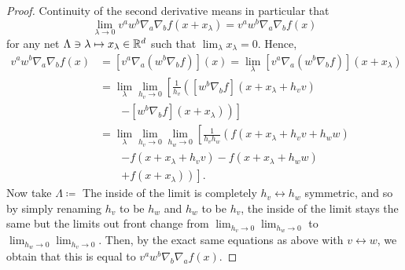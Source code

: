 \begin{thm}
\begin{proof}
Continuity of the second derivative means in particular that
\begin{equation}
\lim _{\lambda \to 0}v^aw^b\nabla _a\nabla _bf(x+x_\lambda )=v^aw^b\nabla _a\nabla _bf(x)
\end{equation}
for any net $\Lambda \ni \lambda \mapsto x_\lambda \in \mathbb{R} ^d$ such that $\lim _\lambda x_\lambda =0$.  Hence,
\begin{equation}
\begin{split}
v^aw^b\nabla _a\nabla _bf(x) & =[v^a\nabla _a(w^b\nabla _bf)](x)=\lim _\lambda [v^a\nabla _a(w^b\nabla _bf)](x+x_\lambda ) \\
& =\lim _\lambda \lim _{h_v\to 0}\left[ \frac{1}{h_v}\left( [w^b\nabla _bf](x+x_\lambda +h_vv)\right. \right. \\
& \qquad \left. \left. -[w^b\nabla _bf](x+x_\lambda )\right) \right] \\
& =\lim _\lambda \lim _{h_v\to 0}\lim _{h_w\to 0}\left[ \frac{1}{h_vh_w}\left( f(x+x_\lambda +h_vv+h_ww)\right. \right. \\
& \qquad \left. \left. -f(x+x_\lambda +h_vv)-f(x+x_\lambda +h_ww)\right. \right. \\
& \qquad \left. \left. +f(x+x_\lambda )\right) \right] .
\end{split}
\end{equation}
Now take $\Lambda \coloneqq $
The inside of the limit is completely $h_v\leftrightarrow h_w$ symmetric, and so by simply renaming $h_v$ to be $h_w$ and $h_w$ to be $h_v$, the inside of the limit stays the same but the limits out front change from $\lim _{h_v\to 0}\lim _{h_w\to 0}$ to $\lim _{h_w\to 0}\lim _{h_v\to 0}$.  Then, by the exact same equations as above with $v\leftrightarrow w$, we obtain that this is equal to $v^aw^b\nabla _b\nabla _af(x)$.
\end{proof}
\end{thm}